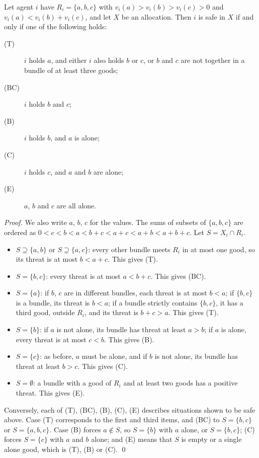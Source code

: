 \documentclass[runningheads,11pt]{llncs}
\begin{document}
\begin{lemma}\label{lem:L5}
Let agent $i$ have $R_i=\{a,b,c\}$ with $v_i(a)>v_i(b)>v_i(c)>0$ and $v_i(a)<v_i(b)+v_i(c)$, and let $X$ be an allocation. Then $i$ is safe in $X$ if and only if one of the following holds:
\begin{description}
\item[(T)] $i$ holds $a$, and either $i$ also holds $b$ or $c$, or $b$ and $c$ are not together in a bundle of at least three goods;
\item[(BC)] $i$ holds $b$ and $c$;
\item[(B)] $i$ holds $b$, and $a$ is alone;
\item[(C)] $i$ holds $c$, and $a$ and $b$ are alone;
\item[(E)] $a$, $b$ and $c$ are all alone.
\end{description}
\end{lemma}

\begin{proof}
We also write $a$, $b$, $c$ for the values. The sums of subsets of $\{a,b,c\}$ are ordered as $0<c<b<a<b+c<a+c<a+b<a+b+c$. Let $S=X_i\cap R_i$.
\begin{itemize}
\item $S\supseteq\{a,b\}$ or $S\supseteq\{a,c\}$: every other bundle meets $R_i$ in at most one good, so its threat is at most $b<a+c$. This gives (T).
\item $S=\{b,c\}$: every threat is at most $a<b+c$. This gives (BC).
\item $S=\{a\}$: if $b$, $c$ are in different bundles, each threat is at most $b<a$; if $\{b,c\}$ is a bundle, its threat is $b<a$; if a bundle strictly contains $\{b,c\}$, it has a third good, outside $R_i$, and its threat is $b+c>a$. This gives (T).
\item $S=\{b\}$: if $a$ is not alone, its bundle has threat at least $a>b$; if $a$ is alone, every threat is at most $c<b$. This gives (B).
\item $S=\{c\}$: as before, $a$ must be alone, and if $b$ is not alone, its bundle has threat at least $b>c$. This gives (C).
\item $S=\emptyset$: a bundle with a good of $R_i$ and at least two goods has a positive threat. This gives (E).
\end{itemize}
Conversely, each of (T), (BC), (B), (C), (E) describes situations shown to be safe above. Case (T) corresponds to the first and third items, and (BC) to $S=\{b,c\}$ or $S=\{a,b,c\}$. Case (B) forces $a\notin S$, so $S=\{b\}$ with $a$ alone, or $S=\{b,c\}$; (C) forces $S=\{c\}$ with $a$ and $b$ alone; and (E) means that $S$ is empty or a single alone good, which is (T), (B) or (C). \qed
\end{proof}
\end{document}

